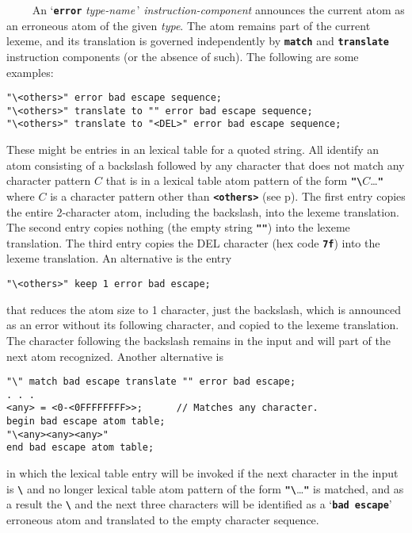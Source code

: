 \documentclass[12pt]{article}
\makeatletter
\newcommand{\TT}[1]{{\tt \bfseries #1}}
\newcommand{\ttmkey}[2]{\TT{#1}\index{#1@\TT{#1}!#2}}
\newcommand{\pagref}[1]{p\pageref{#1}}
\newenvironment{indpar}[1][0.3in]%
	{\begin{list}{}%
		     {\setlength{\itemsep}{0in}%
		      \setlength{\topsep}{0in}%
		      \setlength{\parsep}{1ex}%
		      \setlength{\labelwidth}{#1}%
		      \setlength{\leftmargin}{#1}%
		      \addtolength{\leftmargin}{\labelsep}}%
	 \item}%
	{\end{list}}
\makeatother
\begin{document}
~~~~ An `\ttmkey{error}{in lexical program} {\em type-name}\,'
{\em instruction-component}
an\-noun\-ces the current atom as an erroneous atom of the given {\em type}.
The atom remains part of the current lexeme,
and its translation is governed
independently by \TT{match} and \TT{translate} instruction components
(or the absence of such).
The following are some examples:
\begin{indpar}\begin{verbatim}
"\<others>" error bad escape sequence;
"\<others>" translate to "" error bad escape sequence;
"\<others>" translate to "<DEL>" error bad escape sequence;
\end{verbatim}\end{indpar}
These might be entries in an lexical table for a quoted string.
All identify an atom consisting of a backslash followed by any
character that does not match any character pattern $C$ that is in
a lexical table
atom pattern of the form \TT{"\textbackslash}$C$\ldots\TT{"} where $C$ is a character
pattern other than \TT{<others>} (see \pagref{<OTHERS>}).
The first entry copies the entire 2-character atom, including the
backslash, into the lexeme translation.  The second entry copies
nothing (the empty string \TT{""}) into the lexeme translation.
The third entry copies the DEL character (hex code \TT{7f})
into the lexeme translation.  An alternative is the entry
\begin{indpar}\begin{verbatim}
"\<others>" keep 1 error bad escape;
\end{verbatim}\end{indpar}
that reduces the atom size to 1 character, just the backslash,
which is announced as an error without its following character,
and copied to the lexeme translation.  The character following
the backslash remains in the input and will part of the next
atom recognized.
Another alternative is
\begin{indpar}\begin{verbatim}
"\" match bad escape translate "" error bad escape;
. . .
<any> = <0-<0FFFFFFFF>>;      // Matches any character.
begin bad escape atom table;
"\<any><any><any>"
end bad escape atom table;
\end{verbatim}\end{indpar}
in which the lexical table entry will be invoked if the next character
in the input is \TT{\textbackslash} and no longer
lexical table atom pattern of the form \TT{"\textbackslash}\ldots\TT{"} is matched, 
and as a result the \TT{\textbackslash} and the next three characters will be identified
as a `\TT{bad escape}'
erroneous atom and translated to the empty character sequence.
\end{document}
